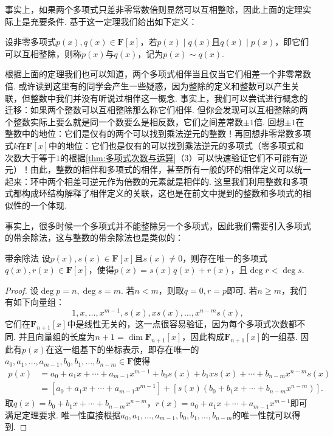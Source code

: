 事实上，如果两个多项式只差非零常数倍则显然可以互相整除，因此上面的定理实际上是充要条件. 基于这一定理我们给出如下定义：
\begin{definition}{}{}
    设非零多项式$p(x),q(x)\in\mathbf{F}[x]$，若$p(x)\mid q(x)$且$q(x)\mid p(x)$，即它们可以互相整除，则称$p(x)$与$q(x)$，记为$p(x)\sim q(x)$.
\end{definition}

根据上面的定理我们也可以知道，两个多项式相伴当且仅当它们相差一个非零常数倍. 或许读到这里有的同学会产生一些疑惑，因为整除的定义和整数可以产生关联，但整数中我们并没有听说过相伴这一概念. 事实上，我们可以尝试进行概念的迁移：如果两个整数可以互相整除那么称它们相伴. 但你会发现可以互相整除的两个整数实际上要么就是同一个数要么是相反数，它们之间差常数$\pm 1$倍. 回想$\pm 1$在整数中的地位：它们是仅有的两个可以找到乘法逆元的整数！再回想非零常数多项式$k$在$\mathbf{F}[x]$中的地位：它们也是仅有的可以找到乘法逆元的多项式（零多项式和次数大于等于$1$的根据\autoref{thm:多项式次数与运算}（3）可以快速验证它们不可能有逆元）！由此，整数的相伴和多项式的相伴，甚至所有一般的环的相伴定义可以统一起来：环中两个相差可逆元作为倍数的元素就是相伴的. 这里我们利用整数和多项式都构成环结构解释了相伴定义的关联，这也是在前文中提到的整数和多项式的相似性的一个体现.

事实上，很多时候一个多项式并不能整除另一个多项式，因此我们需要引入多项式的带余除法，这与整数的带余除法也是类似的：
\begin{theorem}{}{带余除法}
    设$p(x),s(x)\in\mathbf{F}[x]$且$s(x)\neq 0$，则存在唯一的多项式$q(x),r(x)\in\mathbf{F}[x]$，使得$p(x)=s(x)q(x)+r(x)$，且$\deg r<\deg s$.
\end{theorem}
\begin{proof}
    设$\deg p=n,\deg s=m$. 若$n<m$，则取$q=0,r=p$即可. 若$n\geqslant m$，我们有如下向量组：
    \[1,x,\ldots,x^{m-1},s(x),xs(x),\ldots,x^{n-m}s(x),\]
    它们在$\mathbf{F}_{n+1}[x]$中是线性无关的，这一点很容易验证，因为每个多项式次数都不同. 并且向量组的长度为$n+1=\dim\mathbf{F}_{n+1}[x]$，因此构成$\mathbf{F}_{n+1}[x]$的一组基. 因此有$p(x)$在这一组基下的坐标表示，即存在唯一的$a_0,a_1,\ldots,a_{m-1},b_0,b_1,\ldots,b_{n-m}\in\mathbf{F}$使得
    \begin{align*}
        p(x) & =a_0+a_1x+\cdots+a_{m-1}x^{m-1}+b_0s(x)+b_1xs(x)+\cdots+b_{n-m}x^{n-m}s(x) \\
             & =[a_0+a_1x+\cdots+a_{m-1}x^{m-1}]+[s(x)(b_0+b_1x+\cdots+b_{n-m}x^{n-m})].
    \end{align*}
    取$q(x)=b_0+b_1x+\cdots+b_{n-m}x^{n-m}$，$r(x)=a_0+a_1x+\cdots+a_{m-1}x^{m-1}$即可满足定理要求. 唯一性直接根据$a_0,a_1,\ldots,a_{m-1},b_0,b_1,\ldots,b_{n-m}$的唯一性就可以得到.
\end{proof}

